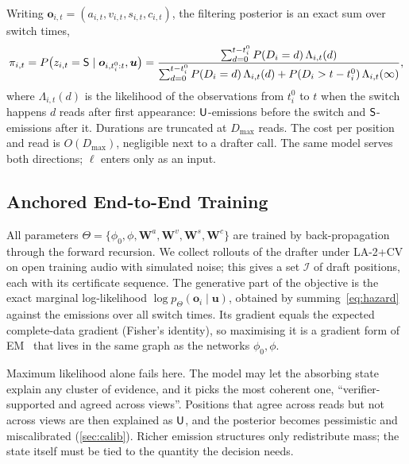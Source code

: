 Writing $\bm{o}_{i,t} = (a_{i,t}, v_{i,t}, s_{i,t}, c_{i,t})$, the filtering posterior is an exact sum over switch times,
\begin{equation}
\pi_{i,t} = P\big(z_{i,t} = \mathsf{S} \mid \bm{o}_{i,t^0_i:t}, \bm{u}\big)
= \frac{\sum_{d=0}^{t - t^0_i} P(D_i = d)\, \Lambda_{i,t}(d)}{\sum_{d=0}^{t - t^0_i} P(D_i = d)\, \Lambda_{i,t}(d) + P(D_i > t - t^0_i)\, \Lambda_{i,t}(\infty)},
\label{eq:posterior}
\end{equation}
where $\Lambda_{i,t}(d)$ is the likelihood of the observations from $t^0_i$ to $t$ when the switch happens $d$ reads after first appearance: $\mathsf{U}$-emissions before the switch and $\mathsf{S}$-emissions after it.
Durations are truncated at $D_{\max}$ reads.
The cost per position and read is $O(D_{\max})$, negligible next to a drafter call.
The same model serves both directions; $\ell$ enters only as an input.

\subsection{Anchored End-to-End Training}
\label{sec:anchor}

All parameters $\Theta = \{\phi_0, \phi, \mathbf{W}^{a}, \mathbf{W}^{v}, \mathbf{W}^{s}, \mathbf{W}^{c}\}$ are trained by back-propagation through the forward recursion.
We collect rollouts of the drafter under LA-2+CV on open training audio with simulated noise; this gives a set $\mathcal{I}$ of draft positions, each with its certificate sequence.
The generative part of the objective is the exact marginal log-likelihood $\log p_\Theta(\bm{o}_i \mid \bm{u})$, obtained by summing~\eqref{eq:hazard} against the emissions over all switch times.
Its gradient equals the expected complete-data gradient (Fisher's identity), so maximising it is a gradient form of EM~\citep{dempster1977em} that lives in the same graph as the networks $\phi_0, \phi$.

Maximum likelihood alone fails here.
The model may let the absorbing state explain any cluster of evidence, and it picks the most coherent one, ``verifier-supported and agreed across views''.
Positions that agree across reads but not across views are then explained as $\mathsf{U}$, and the posterior becomes pessimistic and miscalibrated (\cref{sec:calib}).
Richer emission structures only redistribute mass; the state itself must be tied to the quantity the decision needs.

